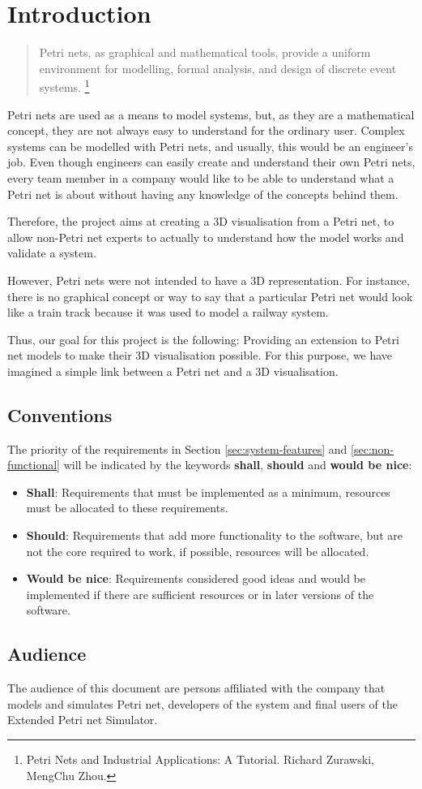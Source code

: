 \section{Introduction}

\begin{quotation}
Petri nets, as graphical and mathematical tools, provide a uniform environment for modelling, formal analysis, and design of discrete event systems. \footnote{Petri Nets and Industrial Applications: A Tutorial. Richard Zurawski, MengChu Zhou.}
\end{quotation}

Petri nets are used as a means to model systems, but, as they are a mathematical concept, they are not always easy to understand for the ordinary user. Complex systems can be modelled with Petri nets, and usually, this would be an engineer's job. Even though engineers can easily create and understand their own Petri nets, every team member in a company would like to be able to understand what a Petri net is about without having any knowledge of the concepts behind them.

Therefore, the project aims at creating a 3D visualisation from a Petri net, to allow non-Petri net experts to actually to understand how the model works and validate a system.

However, Petri nets were not intended to have a 3D representation. For instance, there is no graphical concept or way to say that a particular Petri net would look like a train track because it was used to model a railway system. 

Thus, our goal for this project is the following: Providing an extension to Petri net models to make their 3D visualisation possible. For this purpose, we have imagined a simple link between a Petri net and a 3D visualisation.

\subsection{Conventions}

The priority of the requirements in Section \ref{sec:system-features} and \ref{sec:non-functional} will be indicated by the keywords \textbf{shall}, \textbf{should} and \textbf{would be nice}:

\begin{itemize}
	\item \textbf{Shall}: Requirements that must be implemented as a minimum, resources must be allocated to these requirements.
	\item \textbf{Should}: Requirements that add more functionality to the software, but are not the core required to work, if possible, resources will be allocated.
	\item \textbf{Would be nice}: Requirements considered good ideas and would be implemented if there are sufficient resources or in later versions of the software.
\end{itemize}

\subsection{Audience}

The audience of this document are persons affiliated with the company that models and simulates Petri net, developers of the system and final users of the Extended Petri net Simulator.